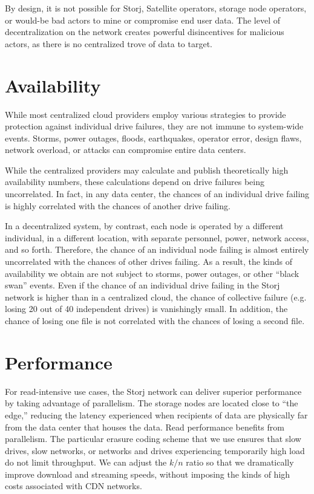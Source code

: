 \documentclass[8pt,fleqn,openany]{book}
\begin{document}
By design, it is not possible for Storj, Satellite operators,
storage node operators, or would-be bad actors to mine or compromise end user
data. The level of decentralization on the network creates powerful disincentives for
malicious actors, as there is no centralized trove of data to target.

\section{Availability}

While most centralized cloud providers employ various strategies to provide
protection against individual drive failures, they are not immune to
system-wide events. Storms, power outages, floods, earthquakes, operator error,
design flaws, network overload, or attacks can compromise entire data centers.

While the centralized providers may calculate and publish theoretically high
availability numbers, these calculations depend on drive failures being
uncorrelated. In fact, in any data center, the chances of an individual drive
failing is highly correlated with the chances of another drive failing.

In a decentralized system, by contrast, each node is operated by a different
individual, in a different location, with separate personnel, power, network
access, and so forth. Therefore, the chance of an individual node failing is almost entirely
uncorrelated with the chances of other drives failing. As a result, the kinds
of availability we obtain are not subject to storms, power outages, or other
``black swan'' events. Even if the chance of an individual drive failing in the
Storj network is higher than in a centralized cloud, the chance of collective
failure (e.g. losing 20 out of 40 independent drives) is vanishingly small.
In addition, the chance of losing one file is not correlated with the chances of
losing a second file.

\section{Performance}

For read-intensive use cases, the Storj network can deliver superior
performance by taking advantage of parallelism. The storage nodes are located
close to ``the edge,'' reducing the latency experienced when recipients of
data are physically far from the data center that houses the data.
Read performance benefits from parallelism. The particular erasure coding
scheme that we use ensures that slow drives, slow networks, or networks and
drives experiencing temporarily high load do not limit throughput. We can
adjust the $k/n$ ratio so that we dramatically improve download and streaming
speeds, without imposing the kinds of high costs associated with CDN networks.
\end{document}
